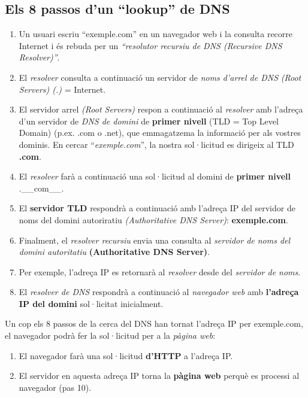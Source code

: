\documentclass[]{article}
\begin{document}
\hypertarget{els-8-passos-dun-lookup-de-dns}{%
\subsection{\texorpdfstring{\textbf{Els 8 passos d'un ``lookup'' de
DNS}}{Els 8 passos d'un ``lookup'' de DNS}}\label{els-8-passos-dun-lookup-de-dns}}

\begin{enumerate}
\def\labelenumi{\arabic{enumi}.}
\item
  Un usuari escriu ``exemple.com'' en un navegador web i la consulta
  recorre Internet i és rebuda per un \emph{``resolutor recursiu de DNS
  (Recursive DNS Resolver)''}.
\item
  El \emph{resolver} consulta a continuació un servidor de \emph{noms
  d'arrel de DNS} \emph{(Root Servers) (.)} = Internet.
\item
  El servidor arrel \emph{(Root Servers)} respon a continuació al
  \emph{resolver} amb l'adreça d'un servidor de \emph{DNS de domini} de
  \textbf{primer nivell} (TLD = Top Level Domain) (p.ex. .com o .net),
  que emmagatzema la informació per als vostres dominis. En cercar
  ``\emph{exemple.com}'', la nostra sol·licitud es dirigeix al TLD
  \textbf{.com}.
\item
  El \emph{resolver} farà a continuació una sol·licitud al domini de
  \textbf{primer nivell} .\_\_com\_\_.
\item
  El \textbf{servidor TLD} respondrà a continuació amb l'adreça IP del
  servidor de noms del domini autoriratiu \emph{(Authoritative DNS
  Server)}: \textbf{exemple.com}.
\item
  Finalment, el \emph{resolver recursiu} envia una consulta al
  \emph{servidor de noms del domini autoritatiu} \textbf{(Authoritative
  DNS Server)}.
\item
  Per exemple, l'adreça IP es retornarà al \emph{resolver} desde del
  \emph{servidor de noms}.
\item
  El \emph{resolver de DNS} respondrà a continuació al \emph{navegador
  web} amb \textbf{l'adreça IP del domini} sol·licitat inicialment.
\end{enumerate}

Un cop els 8 passos de la cerca del DNS han tornat l'adreça IP per
exemple.com, el navegador podrà fer la sol·licitud per a la \emph{pàgina
web}:

\begin{enumerate}
\def\labelenumi{\arabic{enumi}.}
\setcounter{enumi}{8}
\item
  El navegador farà una sol·licitud \textbf{d'HTTP} a l'adreça IP.
\item
  El servidor en aquesta adreça IP torna la \textbf{pàgina web} perquè
  es processi al navegador (pas 10).
\end{enumerate}
\end{document}
